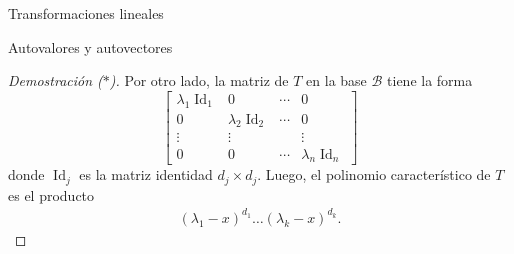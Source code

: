 \documentclass[a4paper,12pt,twoside,spanish,reqno]{amsbook}
\theoremstyle{definition}
\theoremstyle{remark}
\newcommand{\Id}{\operatorname{Id}}
\begin{document}
\begin{chapter}{Transformaciones lineales}
\begin{section}{Autovalores y autovectores}
\begin{proof}[Demostración ($*$)]
            Por otro lado, la matriz de $T$ en la base $\mathcal{B}$ tiene la forma
            \begin{equation*}
                \begin{bmatrix}
                \lambda_1 \Id_1 &0&\cdots&0 \\0&\lambda_2 \Id_2&\cdots&0 \\\vdots&\vdots&&\vdots \\0&0&\cdots&\lambda_n \Id_n 
                \end{bmatrix}
            \end{equation*}
            donde $\Id_j$ es la matriz identidad $d_j \times d_j$. Luego,  el polinomio característico de $T$ es el producto
            \begin{align*}
                (\lambda_1 -x)^{d_1}\ldots(\lambda_k- x)^{d_k}.
            \end{align*}
        \end{proof}
    

\end{section}
\end{chapter}
\end{document}
